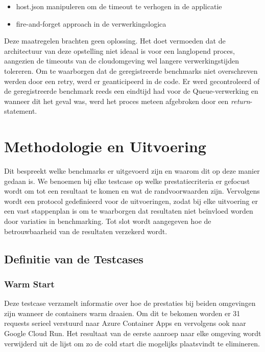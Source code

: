 \begin{itemize}
    \item host.json manipuleren om de timeout te verhogen in de applicatie
    \item fire-and-forget approach in de verwerkingslogica
\end{itemize}

Deze maatregelen brachten geen oplossing. Het doet vermoeden dat de architectuur van deze opstelling niet ideaal is voor een langlopend proces, aangezien de timeouts van de cloudomgeving wel langere verwerkingstijden tolereren. Om te waarborgen dat de geregistreerde benchmarks niet overschreven werden door een retry, werd er geanticipeerd in de code. Er werd gecontroleerd of de geregistreerde benchmark reeds een eindtijd had voor de Queue-verwerking en wanneer dit het geval was, werd het proces meteen afgebroken door een \textit{return}-statement.

\section{Methodologie en Uitvoering}

Dit bespreekt welke benchmarks er uitgevoerd zijn en waarom dit op deze manier gedaan is. We benoemen bij elke testcase op welke prestatiecriteria er gefocust wordt om tot een resultaat te komen en wat de randvoorwaarden zijn. Vervolgens wordt een protocol gedefinieerd voor de uitvoeringen, zodat bij elke uitvoering er een vast stappenplan is om te waarborgen dat resultaten niet beïnvloed worden door variaties in benchmarking. Tot slot wordt aangegeven hoe de betrouwbaarheid van de resultaten verzekerd wordt.

\subsection{Definitie van de Testcases}

\subsubsection{Warm Start}

Deze testcase verzamelt informatie over hoe de prestaties bij beiden omgevingen zijn wanneer de containers warm draaien. Om dit te bekomen worden er 31 requests serieel verstuurd naar Azure Container Apps en vervolgens ook naar Google Cloud Run. Het resultaat van de eerste aanroep naar elke omgeving wordt verwijderd uit de lijst om zo de cold start die mogelijks plaatsvindt te elimineren.

